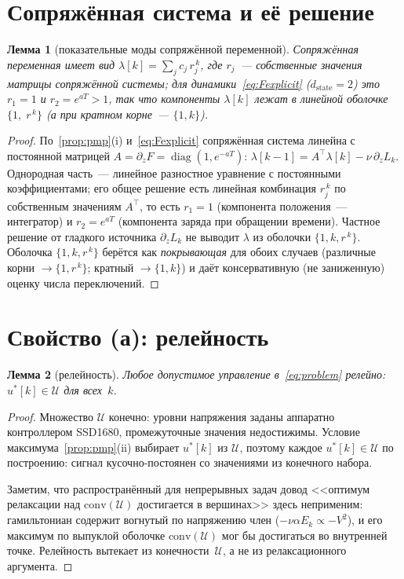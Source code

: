 \documentclass[12pt,a4paper]{article}
\theoremstyle{plain}
\newtheorem{lemma}{Лемма}
\theoremstyle{definition}\newtheorem{remark}{Замечание}
\newcommand{\Ueff}{\mathcal{U}}
\newcommand{\dstate}{d_{\mathrm{state}}}
\begin{document}
\section{Сопряжённая система и её решение}

\begin{lemma}[показательные моды сопряжённой переменной]\label{lem:modes}
Сопряжённая переменная имеет вид $\lambda[k]=\sum_{j} c_j\, r_j^{\,k}$, где $r_j$~---
собственные значения матрицы сопряжённой системы; для динамики~\eqref{eq:Fexplicit}
($\dstate=2$) это $r_1=1$ и $r_2=e^{aT}>1$, так что компоненты $\lambda[k]$ лежат в
линейной оболочке $\{1,\;r^{\,k}\}$ (а при кратном корне~--- $\{1,k\}$).
\end{lemma}
\begin{proof}
По~\ref{prop:pmp}(i) и~\eqref{eq:Fexplicit} сопряжённая система линейна с постоянной
матрицей $A=\partial_z F=\operatorname{diag}(1,e^{-aT})$:
$\lambda[k-1]=A^{\!\top}\lambda[k]-\nu\,\partial_z L_k$. Однородная часть~---
линейное разностное уравнение с постоянными коэффициентами; его общее решение есть
линейная комбинация $r_j^{\,k}$ по собственным значениям $A^{\!\top}$, то есть
$r_1=1$ (компонента положения~--- интегратор) и $r_2=e^{aT}$ (компонента заряда при
обращении времени). Частное решение от гладкого источника $\partial_z L_k$ не выводит
$\lambda$ из оболочки $\{1,k,r^{\,k}\}$. Оболочка $\{1,k,r^{\,k}\}$ берётся как
\emph{покрывающая} для обоих случаев (различные корни $\to\{1,r^{\,k}\}$; кратный
$\to\{1,k\}$) и даёт консервативную (не заниженную) оценку числа переключений. \end{proof}


\section{Свойство (а): релейность}

\begin{lemma}[релейность]\label{lem:bangbang}
Любое допустимое управление в~\eqref{eq:problem} релейно: $u^*[k]\in\Ueff$ для всех~$k$.
\end{lemma}
\begin{proof}
Множество $\Ueff$ конечно: уровни напряжения заданы аппаратно контроллером SSD1680,
промежуточные значения недостижимы. Условие максимума~\ref{prop:pmp}(ii) выбирает
$u^*[k]$ из $\Ueff$, поэтому каждое $u^*[k]\in\Ueff$ по построению: сигнал
кусочно-постоянен со значениями из конечного набора.

Заметим, что распространённый для непрерывных задач довод <<оптимум релаксации
над $\mathrm{conv}(\Ueff)$ достигается в вершинах>> здесь неприменим:
гамильтониан содержит вогнутый по напряжению член ($-\nu\alpha E_k\propto-V^2$), и его
максимум по выпуклой оболочке $\mathrm{conv}(\Ueff)$ мог бы достигаться во внутренней
точке. Релейность вытекает из конечности~$\Ueff$, а не из релаксационного
аргумента. \end{proof}
\end{document}
